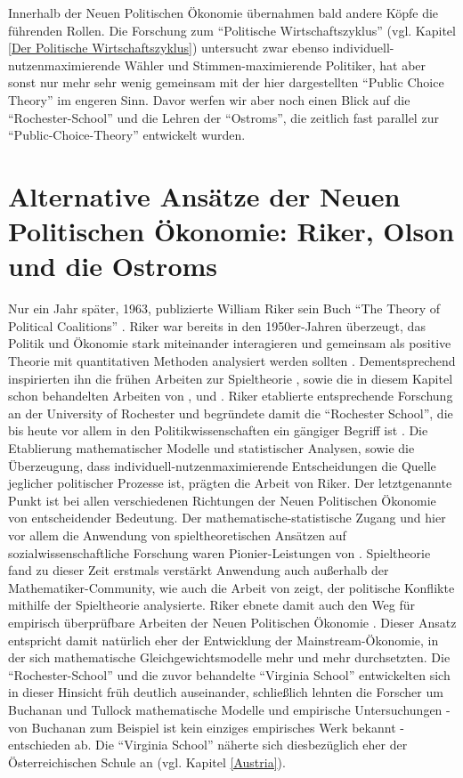 Innerhalb der Neuen Politischen Ökonomie übernahmen bald andere Köpfe die führenden Rollen. Die Forschung zum "`Politische Wirtschaftszyklus"' (vgl. Kapitel \ref{Der Politische Wirtschaftszyklus}) untersucht zwar ebenso individuell-nutzenmaximierende Wähler und Stimmen-maximierende Politiker, hat aber sonst nur mehr sehr wenig gemeinsam mit der hier dargestellten "`Public Choice Theory"' im engeren Sinn. Davor werfen wir aber noch einen Blick auf die "`Rochester-School"' und die Lehren der "`Ostroms"', die zeitlich fast parallel zur "`Public-Choice-Theory"' entwickelt wurden.

\section{Alternative Ansätze der Neuen Politischen Ökonomie: Riker, Olson und die Ostroms }
\label{sec: Alternativen}

Nur ein Jahr später, 1963, publizierte William Riker sein Buch "`The Theory of Political Coalitions"' \parencite{Riker1962}. Riker war bereits in den 1950er-Jahren überzeugt, das Politik und Ökonomie stark miteinander interagieren und gemeinsam als positive Theorie mit quantitativen Methoden analysiert werden sollten \parencite[S. 205]{Maske2003}. Dementsprechend inspirierten ihn die frühen Arbeiten zur Spieltheorie \parencite{Morgenstern1944}, sowie die in diesem Kapitel schon behandelten Arbeiten von \textcite{Downs1957b}, \textcite{Black1948a} und \textcite{Arrow1951} \parencite[S. 205]{Maske2003}. Riker etablierte entsprechende Forschung an der University of Rochester und begründete damit die "`Rochester School"', die bis heute vor allem in den Politikwissenschaften ein gängiger Begriff ist \parencite[S. 270]{Amadae1999}. Die Etablierung mathematischer Modelle und statistischer Analysen, sowie die Überzeugung, dass individuell-nutzenmaximierende Entscheidungen die Quelle jeglicher politischer Prozesse ist, prägten die Arbeit von Riker. Der letztgenannte Punkt ist bei allen verschiedenen Richtungen der Neuen Politischen Ökonomie von entscheidender Bedeutung. Der mathematische-statistische Zugang und hier vor allem die Anwendung von spieltheoretischen Ansätzen auf sozialwissenschaftliche Forschung waren Pionier-Leistungen von \textcite{Riker1962} \parencite[S. 210]{Maske2003}. Spieltheorie fand zu dieser Zeit erstmals verstärkt Anwendung auch außerhalb der Mathematiker-Community, wie auch die Arbeit von \textcite{Schelling1960} zeigt, der politische Konflikte mithilfe der Spieltheorie analysierte. Riker ebnete damit auch den Weg für empirisch überprüfbare Arbeiten der Neuen Politischen Ökonomie \parencite[S. 270]{Amadae1999}. Dieser Ansatz entspricht damit natürlich eher der Entwicklung der Mainstream-Ökonomie, in der sich mathematische Gleichgewichtsmodelle mehr und mehr durchsetzten. Die "`Rochester-School"' und die zuvor behandelte "`Virginia School"' entwickelten sich in dieser Hinsicht früh deutlich auseinander, schließlich lehnten die Forscher um Buchanan und Tullock mathematische Modelle und empirische Untersuchungen - von Buchanan zum Beispiel ist kein einziges empirisches Werk bekannt \parencite[S. 178]{Romer1988} - entschieden ab. Die "`Virginia School"' näherte sich diesbezüglich eher der Österreichischen Schule an (vgl. Kapitel \ref{Austria}).

